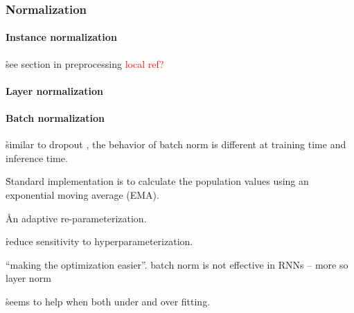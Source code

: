 \subsubsection{Normalization}



\paragraph{Instance normalization}

\r{see section in preprocessing \textcolor{red}{local ref?}}

\paragraph{Layer normalization}

\paragraph{Batch normalization}



\r{similar to dropout \ALR, the behavior of batch norm is different at training time and inference time.}

\r{Standard implementation is to calculate the population values using an exponential moving average (EMA).}



\r{An adaptive re-parameterization.}

\r{reduce sensitivity to hyperparameterization.}


\r{``making the optimization easier''. batch norm is not effective in RNNs -- more so layer norm}

\r{seems to help when both under and over fitting.}

